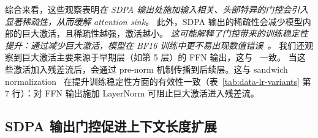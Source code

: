 \documentclass{article} %
\begin{document}
综合来看，这些观察表明\textit{在 SDPA 输出处施加输入相关、头部特异的门控会引入显著稀疏性，从而缓解 attention sink。}
此外，SDPA 输出的稀疏性会减少模型内部的巨大激活，且稀疏性越强，激活越小。
\textit{这可能解释了门控带来的训练稳定性提升：通过减少巨大激活，模型在 BF16 训练中更不易出现数值错误~\citep{budzinskiy2025numerical}。}
我们还观察到巨大激活主要来源于早期层（如第 5 层）的 FFN 输出，这与~\citep{yona2025interpreting} 一致。
当这些激活加入残差流后，会通过 pre-norm 机制传播到后续层。这与 sandwich normalization~\citep{ding2021cogview} 在提升训练稳定性方面的有效性一致（表~\ref{tab:data-lr-variants} 第 7 行）：对 FFN 输出施加 LayerNorm 可阻止巨大激活进入残差流。

\subsection{SDPA 输出门控促进上下文长度扩展}
\label{sec:context_extension}

\begin{table}
\centering
\vskip  -0.15in
\caption{\footnotesize 不同方法在不同序列长度下的性能。`YaRN Extended` 表示扩展上下文长度的变体。
`(数值)` 表示扩展上下文长度后的性能下降幅度。}
\vskip  -0.1in
\label{tab:sequence-length-performance}
\vskip  -0.15in
\end{table}
\end{document}
